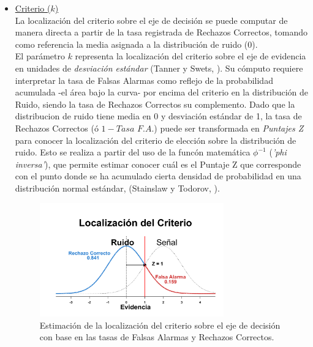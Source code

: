 \begin{itemize}
\item \underline{Criterio ($k$)}\\

La localización del criterio sobre el eje de decisión se puede computar de manera directa a partir de la tasa registrada de Rechazos Correctos, tomando como referencia la media asignada a la distribución de ruido ($0$). \\

El parámetro $k$ representa la localización del criterio sobre el eje de evidencia en unidades de \textit{desviación estándar} (Tanner y Swets, \citeyear{Tanner1954}). Su cómputo requiere interpretar la tasa de Falsas Alarmas como reflejo de la probabilidad acumulada -el área bajo la curva- por encima del criterio en la distribución de Ruido, siendo la tasa de Rechazos Correctos su complemento. Dado que la distribucion de ruido tiene media en 0 y desviación estándar de 1, la tasa de Rechazos Correctos (ó $1 - Tasa$ $F.A.$) puede ser transformada en \textit{Puntajes Z} para conocer la localización del criterio de elección sobre la distribución de ruido. Esto se realiza a partir del uso de la funcón matemática $\phi^{-1}$ (\textit{'phi inversa'}), que permite estimar conocer cuál es el Puntaje Z que corresponde con el punto donde se ha acumulado cierta densidad de probabilidad en una distribución normal estándar, (Stainslaw y Todorov, \citeyear{Stainslaw1999}).

\begin{figure}[h]
\centering
\includegraphics[width=0.75\textwidth]{Figures/Graficador_CriterioR} 
\decoRule
\caption[Estimación paramétrica: La localización del criterio]{Estimación de la localización del criterio sobre el eje de decisión con base en las tasas de Falsas Alarmas y Rechazos Correctos.}
\label{fig:Graf_Criterio}
\end{figure}


\end{itemize}
